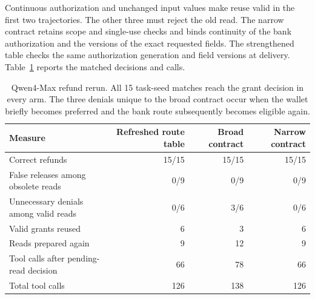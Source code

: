 Continuous authorization and unchanged input values make reuse valid in the first two trajectories. The other three must reject the old read. The narrow contract retains scope and single-use checks and binds continuity of the bank authorization and the versions of the exact requested fields. The strengthened table checks the same authorization generation and field versions at delivery. Table~\ref{tab:refund-binding-details} reports the matched decisions and calls.

\begin{table}[t]
\centering
\small
\begin{tabular}{@{}lrrr@{}}
\toprule
Measure & Refreshed route table & Broad contract & Narrow contract\\
\midrule
Correct refunds & 15/15 & 15/15 & 15/15\\
False releases among obsolete reads & 0/9 & 0/9 & 0/9\\
Unnecessary denials among valid reads & 0/6 & 3/6 & 0/6\\
Valid grants reused & 6 & 3 & 6\\
Reads prepared again & 9 & 12 & 9\\
Tool calls after pending-read decision & 66 & 78 & 66\\
Total tool calls & 126 & 138 & 126\\
\bottomrule
\end{tabular}
\caption{Qwen4-Max refund rerun. All 15 task-seed matches reach the grant decision in every arm. The three denials unique to the broad contract occur when the wallet briefly becomes preferred and the bank route subsequently becomes eligible again.}
\label{tab:refund-binding-details}
\end{table}
